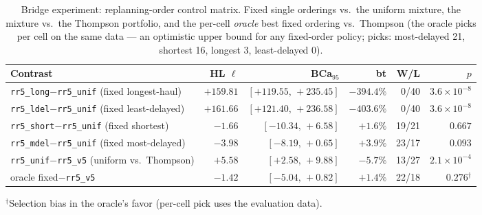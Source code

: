 \begin{table}[t]\centering\small
\caption{Bridge experiment: replanning-order control matrix. Fixed single
orderings vs.\ the uniform mixture, the mixture vs.\ the Thompson portfolio,
and the per-cell \emph{oracle} best fixed ordering vs.\ Thompson (the oracle
picks per cell on the same data --- an optimistic upper bound for any fixed-order
policy; picks: most-delayed 21, shortest 16, longest 3, least-delayed 0).}
\label{stab:bridge-ordering}
\begin{tabular}{@{}lrrrrr@{}}
\toprule
Contrast & HL $\ell$ & BCa$_{95}$ & bt & W/L & $p$ \\
\midrule
\texttt{rr5\_long}$-$\texttt{rr5\_unif} (fixed longest-haul) & $+159.81$ & $[+119.55,\,+235.45]$ & $-394.4\%$ & 0/40 & $3.6\!\times\!10^{-8}$ \\
\texttt{rr5\_ldel}$-$\texttt{rr5\_unif} (fixed least-delayed) & $+161.66$ & $[+121.40,\,+236.58]$ & $-403.6\%$ & 0/40 & $3.6\!\times\!10^{-8}$ \\
\texttt{rr5\_short}$-$\texttt{rr5\_unif} (fixed shortest) & $-1.66$ & $[-10.34,\,+6.58]$ & $+1.6\%$ & 19/21 & $0.667$ \\
\texttt{rr5\_mdel}$-$\texttt{rr5\_unif} (fixed most-delayed) & $-3.98$ & $[-8.19,\,+0.65]$ & $+3.9\%$ & 23/17 & $0.093$ \\
\texttt{rr5\_unif}$-$\texttt{rr5\_v5} (uniform vs.\ Thompson) & $+5.58$ & $[+2.58,\,+9.88]$ & $-5.7\%$ & 13/27 & $2.1\!\times\!10^{-4}$ \\
oracle fixed$-$\texttt{rr5\_v5} & $-1.42$ & $[-5.04,\,+0.82]$ & $+1.4\%$ & 22/18 & $0.276$$^{\dagger}$ \\
\bottomrule
\end{tabular}
\par\smallskip\raggedright\footnotesize $^{\dagger}$Selection bias in the
oracle's favor (per-cell pick uses the evaluation data).
\end{table}
